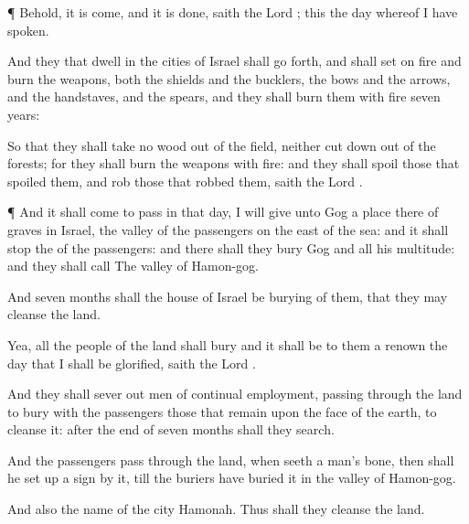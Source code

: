 {\par }{\PP {}¶ Behold, it is
come, and it is
done,
saith the
Lord
{}; this
{} the
day whereof I have
spoken.

And they that
dwell in the
cities of
Israel shall go
forth, and shall
set on
fire and
burn the
weapons, both the
shields and the
bucklers, the
bows and the
arrows, and the
handstaves, and the
spears, and they shall
burn them with
fire
seven
years:

So that they shall
take no
wood out of the
field, neither cut
down
{} out of the
forests; for they shall
burn the
weapons with
fire: and they shall
spoil those that
spoiled them, and
rob those that
robbed them,
saith the
Lord
{}.


\par }{\PP {}¶ And it shall come to pass in that
day,
{} I will
give unto
Gog a
place there of
graves in
Israel, the
valley of the
passengers on the
east of the
sea: and it shall
stop the
{} of the
passengers: and there shall they
bury
Gog and all his
multitude: and they shall
call
{} The
valley of
Hamon-gog.

And
seven
months shall the
house of
Israel be
burying of them, that they may
cleanse the
land.

Yea, all the
people of the
land shall
bury
{} and it shall be to them a
renown the
day that I shall be
glorified,
saith the
Lord
{}.

And they shall sever
out
men of continual
employment, passing
through the
land to
bury with the
passengers those that
remain upon the
face of the
earth, to
cleanse it: after the
end of
seven
months shall they
search.

And the
passengers
{} pass
through the
land, when
{}
seeth a
man’s
bone, then shall he set
up a
sign
by it, till the
buriers have
buried it in the
valley of
Hamon-gog.

And also the
name of the
city
{}
Hamonah. Thus shall they
cleanse the
land.


}
